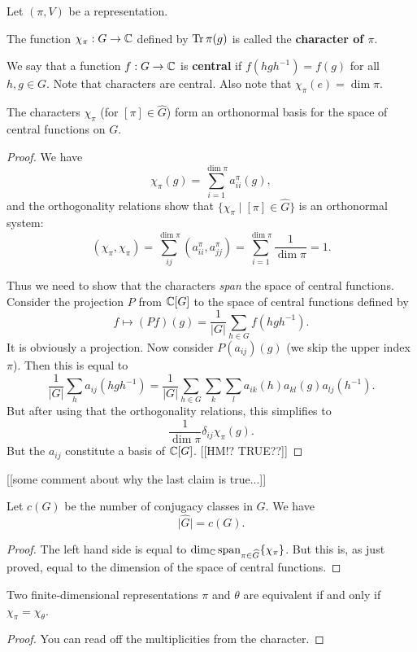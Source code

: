 \documentclass[11pt, english]{article}
\begin{document}
Let $(\pi,V)$ be a representation. 

The function $\chi_\pi:G \to \mathbb{C}$ defined by $\operatorname{Tr} \pi(g)$ is called the \textbf{character of $\pi$}.

We say that a function $f:G \to \mathbb{C}$ is \textbf{central} if $f(hgh^{-1})=f(g)$ for all $h,g \in G$. Note that characters are central. Also note that $\chi_\pi(e)=\dim \pi$. 

\begin{thm}
 The characters $\chi_\pi$ (for $[\pi] \in \widehat G$) form an orthonormal basis for the space of central functions on $G$.
\end{thm}
\begin{proof}
 We have
$$
\chi_\pi(g) = \sum_{i=1}^{\dim \pi} a_{ii}^\pi(g),
$$
and the orthogonality relations show that $\{ \chi_\pi \mid [\pi] \in \widehat G \}$ is an orthonormal system:
$$
(\chi_\pi, \chi_\pi) = \sum_{ij}^{\dim \pi} (a_{ii}^\pi, a_{jj}^\pi) = 
\sum_{i=1}^{\dim \pi} \frac{1}{\dim \pi} = 1.
$$

Thus we need to show that the characters \emph{span} the space of central functions. Consider the projection $P$ from $\mathbb{C}[G]$ to the space of central functions defined by
$$
f \mapsto (Pf)(g) = \frac{1}{\lvert G \rvert }\sum_{h \in G} f(hgh^{-1}).
$$
It is obviously a projection. Now consider $P(a_{ij})(g)$ (we skip the upper index $\pi$). Then this is equal to
$$
\frac{1}{\lvert G \rvert} \sum_h a_{ij}(hgh^{-1}) = \frac{1}{\lvert G \rvert} \sum_{h \in G} \sum_k \sum_l a_{ik}(h) a_{kl}(g) a_{lj}(h^{-1}).
$$
But after using that the orthogonality relations, this simplifies to
$$
\frac{1}{\dim \pi} \delta_{ij} \chi_\pi(g).
$$
But the $a_{ij}$ constitute a basis of $\mathbb{C}[G]$. [[HM!? TRUE??]]
\end{proof}

[[some comment about why the last claim is true...]]

\begin{corr}
Let $c(G)$ be the number of conjugacy classes in $G$. We have
$$
\lvert \widehat G \rvert = c(G).
$$
\end{corr}
\begin{proof}
 The left hand side is equal to $\dim_{\mathbb{C}} \text{span}_{\pi \in \widehat G} \{ \chi_\pi \}$. But this is, as just proved, equal to the dimension of the space of central functions.
\end{proof}

\begin{corr}
 Two finite-dimensional representations $\pi$ and $\theta$ are equivalent if and only if $\chi_\pi = \chi_\theta$.
\end{corr}
\begin{proof}
  You can read off the multiplicities from the character.
\end{proof}
\end{document}

